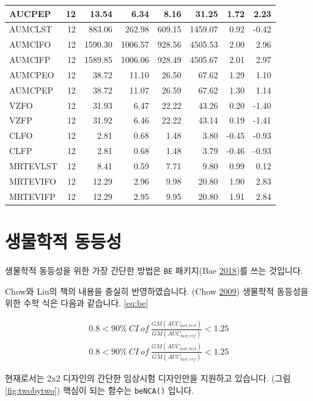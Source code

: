 \documentclass[12pt,]{krantz}
\begin{document}
\begin{tabular}{l|r|r|r|r|r|r|r}
\hline
AUCPEP & 12 & 13.54 & 6.34 & 8.16 & 31.25 & 1.72 & 2.23\\
\hline
AUMCLST & 12 & 883.06 & 262.98 & 609.15 & 1459.07 & 0.92 & -0.42\\
\hline
AUMCIFO & 12 & 1590.30 & 1006.57 & 928.56 & 4505.53 & 2.00 & 2.96\\
\hline
AUMCIFP & 12 & 1589.85 & 1006.06 & 928.49 & 4505.67 & 2.01 & 2.97\\
\hline
AUMCPEO & 12 & 38.72 & 11.10 & 26.50 & 67.62 & 1.29 & 1.10\\
\hline
AUMCPEP & 12 & 38.72 & 11.07 & 26.59 & 67.62 & 1.30 & 1.14\\
\hline
VZFO & 12 & 31.93 & 6.47 & 22.22 & 43.26 & 0.20 & -1.40\\
\hline
VZFP & 12 & 31.92 & 6.46 & 22.22 & 43.14 & 0.19 & -1.41\\
\hline
CLFO & 12 & 2.81 & 0.68 & 1.48 & 3.80 & -0.45 & -0.93\\
\hline
CLFP & 12 & 2.81 & 0.68 & 1.48 & 3.79 & -0.46 & -0.93\\
\hline
MRTEVLST & 12 & 8.41 & 0.59 & 7.71 & 9.80 & 0.99 & 0.12\\
\hline
MRTEVIFO & 12 & 12.29 & 2.96 & 9.98 & 20.80 & 1.90 & 2.83\\
\hline
MRTEVIFP & 12 & 12.29 & 2.95 & 9.95 & 20.80 & 1.91 & 2.84\\
\hline
\end{tabular}

\hypertarget{bioequivalence}{%
\section{생물학적 동등성}\label{bioequivalence}}

생물학적 동등성을 위한 가장 간단한 방법은 \texttt{BE} 패키지(Bae \protect\hyperlink{ref-R-BE}{2018})를 쓰는 것입니다.

Chow와 Liu의 책의 내용을 충실히 반영하였습니다. (Chow \protect\hyperlink{ref-chow2009design}{2009})
생물학적 동등성을 위한 수학 식은 다음과 같습니다. \eqref{eq:be}

\[
\begin{align}
  0.8 < 90\%\ CI\ of\ \frac{GM(AUC_{last, test})}{GM(AUC_{last, ref})} < 1.25 \\
  0.8 < 90\%\ CI\ of\ \frac{GM(AUC_{last, test})}{GM(AUC_{last, ref})} < 1.25 \label{eq:be}
\end{align}
\]

현재로서는 2x2 디자인의 간단한 임상시험 디자인만을 지원하고 있습니다. (그림 \ref{fig:twobytwo})
핵심이 되는 함수는 \texttt{beNCA()} 입니다.
\end{document}
